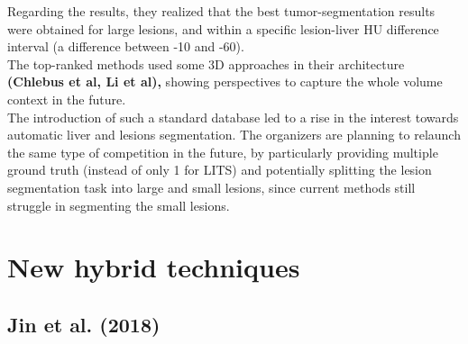 Regarding the results, they realized that the best tumor-segmentation
results were obtained for large lesions, and within a specific
lesion-liver HU difference interval (a difference between -10 and -60).\\
The top-ranked methods used some 3D approaches in their architecture
\textbf{(Chlebus et al, Li et al),} showing perspectives to capture the
whole volume context in the future.\\
The introduction of such a standard database led to a rise in the
interest towards automatic liver and lesions segmentation. The
organizers are planning to relaunch the same type of competition in the
future, by particularly providing multiple ground truth (instead of only
1 for LITS) and potentially splitting the lesion segmentation task into
large and small lesions, since current methods still struggle in
segmenting the small lesions.

\section{New hybrid techniques}\label{new-hybrid-techniques}

\subsection{Jin et al. (2018)}\label{jin-et-al.-2018}

